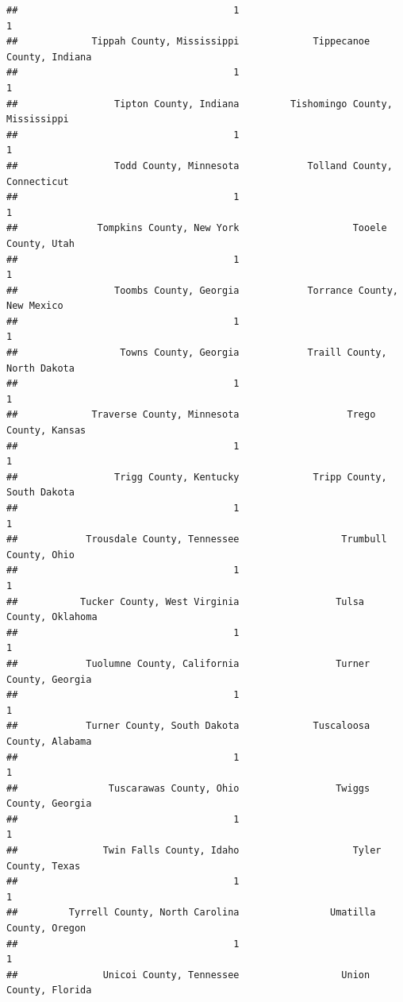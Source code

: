 \documentclass[
]{article}
\begin{document}
\begin{verbatim}
##                                      1                                      1 
##             Tippah County, Mississippi             Tippecanoe County, Indiana 
##                                      1                                      1 
##                 Tipton County, Indiana         Tishomingo County, Mississippi 
##                                      1                                      1 
##                 Todd County, Minnesota            Tolland County, Connecticut 
##                                      1                                      1 
##              Tompkins County, New York                    Tooele County, Utah 
##                                      1                                      1 
##                 Toombs County, Georgia            Torrance County, New Mexico 
##                                      1                                      1 
##                  Towns County, Georgia            Traill County, North Dakota 
##                                      1                                      1 
##             Traverse County, Minnesota                   Trego County, Kansas 
##                                      1                                      1 
##                 Trigg County, Kentucky             Tripp County, South Dakota 
##                                      1                                      1 
##            Trousdale County, Tennessee                  Trumbull County, Ohio 
##                                      1                                      1 
##           Tucker County, West Virginia                 Tulsa County, Oklahoma 
##                                      1                                      1 
##            Tuolumne County, California                 Turner County, Georgia 
##                                      1                                      1 
##            Turner County, South Dakota             Tuscaloosa County, Alabama 
##                                      1                                      1 
##                Tuscarawas County, Ohio                 Twiggs County, Georgia 
##                                      1                                      1 
##               Twin Falls County, Idaho                    Tyler County, Texas 
##                                      1                                      1 
##         Tyrrell County, North Carolina                Umatilla County, Oregon 
##                                      1                                      1 
##               Unicoi County, Tennessee                  Union County, Florida 

\end{verbatim}
\end{document}
